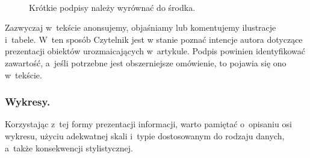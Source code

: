 {

\begin{figure}[!h]
	\centering
	\\
		\caption{Krótkie podpisy należy wyrównać do środka.}
		\label{fig:devop}
\end{figure}
}

\noindent Zazwyczaj w~tekście anonsujemy, objaśniamy lub komentujemy ilustracje i~tabele. W~ten sposób Czytelnik jest w stanie poznać intencje autora dotyczące prezentacji obiektów urozmaicających w~artykule. Podpis powinien identyfikować zawartość, a~jeśli potrzebne jest obszerniejsze omówienie, to pojawia się ono w~tekście.

\subsubsection{Wykresy.}
\label{subsubsec:charts}

Korzystając z~tej formy prezentacji informacji, warto pamiętać o~opisaniu osi wykresu, użyciu adekwatnej skali i~typie dostosowanym do rodzaju danych, a~także konsekwencji stylistycznej.

